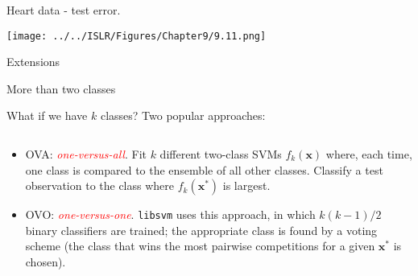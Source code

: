 \documentclass[10pt,ignorenonframetext,]{beamer}
\providecommand{\tightlist}{%
  \setlength{\itemsep}{0pt}\setlength{\parskip}{0pt}}
\begin{document}
\begin{frame}

Heart data - test error.

\centering

\texttt{[image: ../../ISLR/Figures/Chapter9/9.11.png]}

\end{frame}

\begin{frame}[fragile]{Extensions}
\protect\hypertarget{extensions}{}

\begin{block}{More than two classes}

\vspace{2mm}

What if we have \(k\) classes? Two popular approaches:

\(~\)

\begin{itemize}
\tightlist
\item
  OVA: \emph{\textcolor{red}{one-versus-all}}. Fit \(k\) different
  two-class SVMs \(f_k({\boldsymbol x})\) where, each time, one class is
  compared to the ensemble of all other classes. Classify a test
  observation to the class where \(f_k({\boldsymbol x}^*)\) is largest.
\end{itemize}

\vspace{2mm}

\begin{itemize}
\tightlist
\item
  OVO: \emph{\textcolor{red}{one-versus-one}}. \texttt{libsvm} uses this
  approach, in which \(k(k-1)/2\) binary classifiers are trained; the
  appropriate class is found by a voting scheme (the class that wins the
  most pairwise competitions for a given \({\boldsymbol x}^*\) is
  chosen).
\end{itemize}

\end{block}

\end{frame}
\end{document}
